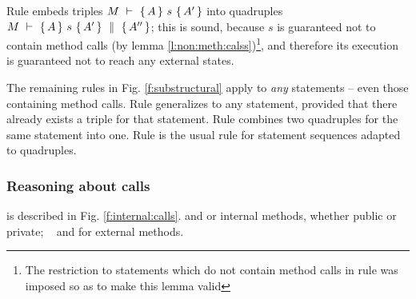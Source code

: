 {Rule {} embeds  triples  ${\hproves{M}  {A} {\ s\ }{A'} }$  into quadruples ${M\ \vdash\ \{\,A\, \} \ s\  \{\,A'\, \}\, \,\parallel\,\, \{\, A'' \, \} }$; this is sound, because $s$ is guaranteed not to contain method calls (by lemma \ref{l:non:meth:calss})\footnote{The restriction to statements which do not contain method calls in rule {} was imposed so as to make this lemma valid}, and therefore its execution is guaranteed not to reach any external states.

 
The remaining rules in Fig. \ref{f:substructural} apply to \emph{any} statements -- even those containing method calls.
 Rule {} generalizes {} to any statement, provided that  there already exists a triple for that statement.
Rule {} combines two quadruples for the same statement into one.
Rule   {}is the usual rule  for statement sequences  adapted to quadruples.



\subsubsection{Reasoning about   calls}
\label{s:calls}
is described in Fig. \ref{f:internal:calls}. {}  and {}  or internal methods, whether public or private;  \  {} 
and {} for  external methods.


}
